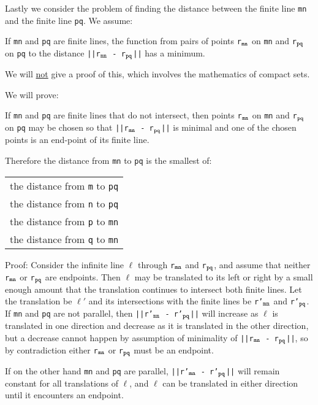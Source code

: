 \documentclass[12pt]{article}
\begin{document}
Lastly we consider the problem of finding the distance between
the finite line {\tt mn} and the finite line {\tt pq}.  We assume:

\begin{theorem}
If {\tt mn} and {\tt pq} are finite lines, the function from pairs
of points
{\tt r$_{\tt mn}$} on {\tt mn} and
{\tt r$_{\tt pq}$} on {\tt pq}  to the distance
{\tt ||r$_{\tt mn}$ - r$_{\tt pq}$||} has a minimum.
\end{theorem}

We will \underline{not} give a proof of this,
which involves the mathematics of compact sets.

We will prove:

\begin{theorem}
\label{FINITE-LINE-DISTANCE-THEOREM}
If {\tt mn} and {\tt pq} are finite lines that do not intersect, then
points {\tt r$_{\tt mn}$} on {\tt mn} and
{\tt r$_{\tt pq}$} on {\tt pq} may be chosen so that
{\tt ||r$_{\tt mn}$ - r$_{\tt pq}$||} is minimal and
one of the chosen points is an end-point of its finite line.

Therefore the distance from {\tt mn} to {\tt pq} is the
smallest of: \\
\hspace*{0.5in}\begin{tabular}{l}
the distance from {\tt m} to {\tt pq} \\
the distance from {\tt n} to {\tt pq} \\
the distance from {\tt p} to {\tt mn} \\
the distance from {\tt q} to {\tt mn} \\
\end{tabular}
\end{theorem}

\begin{indpar}{0.3in}
Proof:  Consider the infinite line $\ell$ through
{\tt r$_{\tt mn}$} and {\tt r$_{\tt pq}$}, and assume that
neither
{\tt r$_{\tt mn}$} or {\tt r$_{\tt pq}$} are endpoints.
Then $\ell$ may be translated to its left or right by
a small enough amount that the translation continues
to intersect both finite lines.  Let the translation
be $\ell'$ and its intersections with the finite lines be
{\tt r'$_{\tt mn}$} and {\tt r'$_{\tt pq}$}.
If {\tt mn} and {\tt pq} are not parallel, then
{\tt ||r'$_{\tt mn}$ - r'$_{\tt pq}$||} will increase
as $\ell$ is translated in one direction and decrease as
it is translated in the other direction, but a decrease
cannot happen by assumption of minimality of
{\tt ||r$_{\tt mn}$ - r$_{\tt pq}$||}, so by contradiction either
{\tt r$_{\tt mn}$} or {\tt r$_{\tt pq}$} must be an endpoint.

If on the other hand {\tt mn} and {\tt pq} are parallel,
{\tt ||r'$_{\tt mn}$ - r'$_{\tt pq}$||} will remain constant
for all translations of $\ell$, and $\ell$ can be translated
in either direction until it encounters an endpoint.
\end{indpar}
\end{document}
